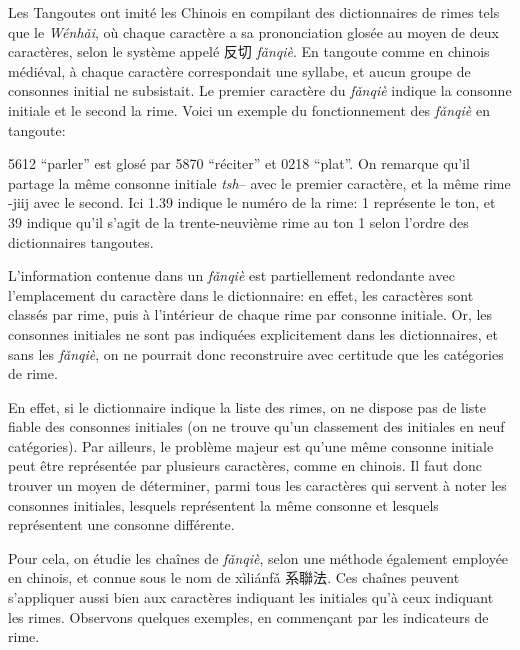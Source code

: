 \documentclass[oldfontcommands,twoside,a4paper,11pt,draft]{memoir}
\newcommand{\ipa}[1]{{\phon #1}} %
\newcommand{\zh}[1]{{\cn #1}}
\newcommand{\tgz}[1]{#1 \mo{#1} \tg{#1}}
\begin{document}
Les Tangoutes ont imité les Chinois en compilant des dictionnaires de rimes tels que le \textit{Wénhǎi}, où chaque caractère a sa prononciation glosée au moyen de deux caractères, selon le système appelé \zh{反切} \textit{fǎnqiè}. En tangoute comme en chinois médiéval, à chaque caractère correspondait une syllabe, et aucun groupe de consonnes initial ne subsistait. Le premier caractère du \textit{fǎnqiè} indique la consonne initiale et le second la rime. Voici un exemple du fonctionnement des \textit{fǎnqiè} en tangoute:

 \tgz{5612} ``parler'' est glosé par \tgz{5870} ``réciter'' et \tgz{0218} ``plat''. On remarque qu'il partage la même consonne initiale \textit{tsh}-- avec le premier caractère, et la même rime -jiij avec le second. Ici 1.39 indique le numéro de la rime: 1 représente le ton, et 39 indique qu'il s'agit de la trente-neuvième rime au ton 1 selon l'ordre des dictionnaires tangoutes.
 
 L'information contenue dans un \textit{fǎnqiè} est partiellement redondante avec l'emplacement du caractère dans le dictionnaire: en effet, les caractères sont classés par rime, puis à l'intérieur de chaque rime par consonne initiale. Or, les consonnes initiales ne sont pas indiquées explicitement dans les dictionnaires, et sans les \textit{fǎnqiè}, on ne pourrait donc reconstruire  avec certitude que les catégories de rime.
 
En effet, si le dictionnaire indique la liste des rimes, on ne dispose pas de liste fiable des consonnes initiales (on ne trouve qu'un classement des initiales en neuf catégories). Par ailleurs, le problème majeur est qu'une même consonne initiale peut être représentée par plusieurs caractères, comme en chinois. Il faut donc trouver un moyen de déterminer, parmi tous les caractères qui servent à noter les consonnes initiales, lesquels représentent la même consonne et lesquels représentent une consonne différente.

 Pour cela, on étudie les chaînes de \textit{fǎnqiè}, selon une méthode également employée en chinois, et connue sous le nom de \ipa{xìliánfǎ} \zh{系聯法}. Ces chaînes peuvent s'appliquer aussi bien aux caractères indiquant les initiales qu'à ceux indiquant les rimes. Observons quelques exemples, en commençant par les indicateurs de rime.
\end{document}

